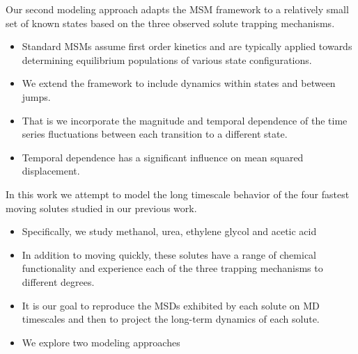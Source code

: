 \documentclass{article}
\begin{document}
  Our second modeling approach adapts the MSM framework to a relatively small set
  of known states based on the three observed solute trapping mechanisms.
  \begin{itemize}
    \item Standard MSMs assume first order kinetics and are typically applied 
    towards determining equilibrium populations of various state configurations.
    \item We extend the framework to include dynamics within states and
    between jumps. 
    \item That is we incorporate the magnitude and temporal dependence of the 
    time series fluctuations between each transition to a different state. 
    \item Temporal dependence has a significant influence on mean squared displacement.
  \end{itemize}
  
  In this work we attempt to model the long timescale behavior of the four 
  fastest moving solutes studied in our previous work.
  \begin{itemize}
    \item Specifically, we study methanol, urea, ethylene glycol and acetic acid
    \item In addition to moving quickly, these solutes have a range of chemical
    functionality and experience each of the three trapping mechanisms to different
    degrees.
    \item It is our goal to reproduce the MSDs exhibited by each solute on MD timescales
    and then to project the long-term dynamics of each solute. 
    \item We explore two modeling approaches
  \end{itemize}

\end{document}
